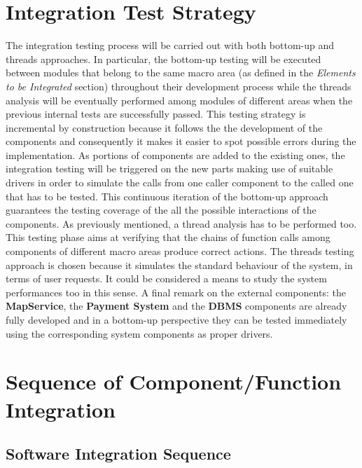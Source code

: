\documentclass[11pt,a4paper]{report}
\begin{document}
\section{Integration Test Strategy}
The integration testing process will be carried out with both bottom-up and threads approaches. In particular, the bottom-up testing will be executed between modules that belong to the same macro area (as defined in the \textit{Elements to be Integrated} section) throughout their development process while the threads analysis will be eventually performed among modules of different areas when the previous internal tests are successfully passed.
This testing strategy is incremental by construction because it follows the the development of the components and consequently it makes it easier to spot possible errors during the implementation. As portions of components are added to the existing ones, the integration testing will be triggered on the new parts making use of suitable drivers in order to simulate the calls from one caller component to the called one that has to be tested.
This continuous iteration of the bottom-up approach guarantees the testing coverage of the all the possible interactions of the components.
As previously mentioned, a thread analysis has to be performed too. This testing phase aims at verifying that the chains of function calls among components of different macro areas produce correct actions. The threads testing approach is chosen because it simulates the standard behaviour of the system, in terms of user requests. It could be considered a means to study the system performances too in this sense.
A final remark on the external components: the \textbf{MapService}, the \textbf{Payment System} and the \textbf{DBMS} components are already fully developed and in a bottom-up perspective they can be tested immediately using the corresponding system components as proper drivers. 
\section{Sequence of Component/Function Integration}
\subsection{Software Integration Sequence}
\end{document}
